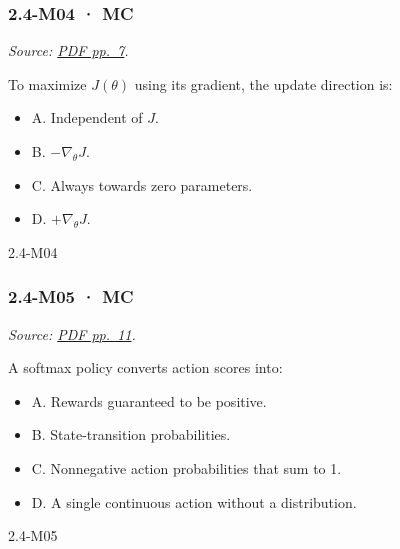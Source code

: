 \noindent\begin{minipage}{\linewidth}

\subsubsection{2.4-M04 · MC}\label{m04-mc-6}

\emph{Source:
\href{../Lecture\%20Slides/2.4.\%20Policy\%20Search.pdf\#page=7}{PDF
pp.~7}.}

To maximize \(J(\theta)\) using its gradient, the update direction is:

\begin{itemize}
\tightlist
\item
  A. Independent of \(J\).
\item
  B. \(-\nabla_\theta J\).
\item
  C. Always towards zero parameters.
\item
  D. \(+\nabla_\theta J\).
\end{itemize}

\begin{solution}[8mm]{2.4-M04}

\end{solution}
\end{minipage}\par\medskip

\noindent\begin{minipage}{\linewidth}

\subsubsection{2.4-M05 · MC}\label{m05-mc-6}

\emph{Source:
\href{../Lecture\%20Slides/2.4.\%20Policy\%20Search.pdf\#page=11}{PDF
pp.~11}.}

A softmax policy converts action scores into:

\begin{itemize}
\tightlist
\item
  A. Rewards guaranteed to be positive.
\item
  B. State-transition probabilities.
\item
  C. Nonnegative action probabilities that sum to 1.
\item
  D. A single continuous action without a distribution.
\end{itemize}

\begin{solution}[8mm]{2.4-M05}

\end{solution}
\end{minipage}\par\medskip

